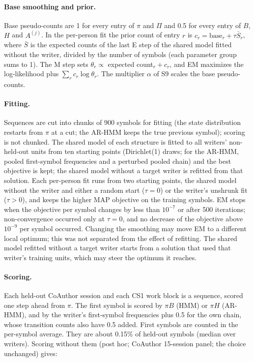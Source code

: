 \documentclass[10pt]{article}
\begin{document}
\paragraph{Base smoothing and prior.} Base pseudo-counts are 1 for every entry of $\pi$ and $\Pi$ and 0.5 for every entry of $B$, $H$ and $A^{(j)}$. In the per-person fit the prior count of entry $r$ is $c_r=\text{base}_r+\tau\bar S_r$, where $\bar S$ is the expected counts of the last E step of the shared model fitted without the writer, divided by the number of symbols (each parameter group sums to 1). The M step sets $\theta_r\propto$ expected count$_r+c_r$, and EM maximizes the log-likelihood plus $\sum_r c_r\log\theta_r$. The multiplier $\alpha$ of S9 scales the base pseudo-counts.

\paragraph{Fitting.} Sequences are cut into chunks of 900 symbols for fitting (the state distribution restarts from $\pi$ at a cut; the AR-HMM keeps the true previous symbol); scoring is not chunked. The shared model of each structure is fitted to all writers' non-held-out units from ten starting points (Dirichlet(1) draws; for the AR-HMM, pooled first-symbol frequencies and a perturbed pooled chain) and the best objective is kept; the shared model without a target writer is refitted from that solution. Each per-person fit runs from two starting points, the shared model without the writer and either a random start ($\tau=0$) or the writer's unshrunk fit ($\tau>0$), and keeps the higher MAP objective on the training symbols. EM stops when the objective per symbol changes by less than $10^{-7}$ or after 500 iterations; non-convergence occurred only at $\tau=0$, and no decrease of the objective above $10^{-9}$ per symbol occurred. Changing the smoothing may move EM to a different local optimum; this was not separated from the effect of refitting. The shared model refitted without a target writer starts from a solution that used that writer's training units, which may steer the optimum it reaches.

\paragraph{Scoring.} Each held-out CoAuthor session and each CS1 work block is a sequence, scored one step ahead from $\pi$. The first symbol is scored by $\pi B$ (HMM) or $\pi H$ (AR-HMM), and by the writer's first-symbol frequencies plus 0.5 for the own chain, whose transition counts also have 0.5 added. First symbols are counted in the per-symbol average. They are about 0.15\% of held-out symbols (median over writers). Scoring without them (post hoc; CoAuthor 15-session panel; the choice unchanged) gives:
\end{document}

